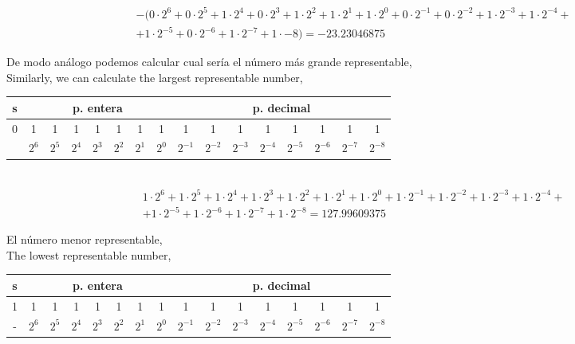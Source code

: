 \begin{equation*}
\begin{split}
&-(0\cdot 2^6+0 \cdot 2^5+ 1\cdot 2^4+ 0 \cdot 2^3+ 1 \cdot 2^2 + 1 \cdot 2^1 + 1 \cdot 2^0 + 0 \cdot 2^{-1}+ 0 \cdot 2^{-2}+ 1 \cdot 2^{-3}+ 1 \cdot 2^{-4}+ \\
& +1 \cdot 2^{-5}+0 \cdot 2^{-6} +1 \cdot 2^{-7}+1 \cdot {-8}) = - 23.23046875
\end{split}
\end{equation*}

\begin{paracol}{2}
De modo análogo podemos calcular cual sería el número más grande representable,\\
\switchcolumn
Similarly, we can calculate the largest representable number, 
\end{paracol}

\begin{tabular}{|c||c|c|c|c|c|c|c||c|c|c|c|c|c|c|c|}
\hline
s&\multicolumn{7}{c||}{p. entera}&\multicolumn{8}{c|}{p. decimal}\\
\hline
0&1&1&1&1&1&1&1&1&1&1&1&1&1&1&1\\
\hline
&$2^{6}$&$2^{5}$&$2^{4}$&$2^{3}$&$2^{2}$&$2^{1}$&$2^{0}$&$2^{-1}$&$2^{-2}$&$2^{-3}$&$2^{-4}$&$2^{-5}$&$2^{-6}$&$2^{-7}$&$2^{-8}$\\
\hline
\end{tabular}\\

\begin{equation*}
\begin{split}
&1\cdot 2^6+1 \cdot 2^5+ 1\cdot 2^4+ 1 \cdot 2^3+ 1 \cdot 2^2 + 1 \cdot 2^1 + 1 \cdot 2^0 + 1 \cdot 2^{-1}+ 1 \cdot 2^{-2}+ 1 \cdot 2^{-3}+ 1 \cdot 2^{-4}+ \\
&+1 \cdot 2^{-5}+1 \cdot 2^{-6} +1 \cdot 2^{-7}+ 1\cdot 2^{-8} =  127.99609375
\end{split}
\end{equation*}

\begin{paracol}{2}
El número menor representable,\\
\switchcolumn
The lowest representable number,
\end{paracol}

\begin{tabular}{|c||c|c|c|c|c|c|c||c|c|c|c|c|c|c|c|}
\hline
s&\multicolumn{7}{c||}{p. entera}&\multicolumn{8}{c|}{p. decimal}\\
\hline
1&1&1&1&1&1&1&1&1&1&1&1&1&1&1&1\\
\hline
-&$2^{6}$&$2^{5}$&$2^{4}$&$2^{3}$&$2^{2}$&$2^{1}$&$2^{0}$&$2^{-1}$&$2^{-2}$&$2^{-3}$&$2^{-4}$&$2^{-5}$&$2^{-6}$&$2^{-7}$&$2^{-8}$\\
\hline
\end{tabular}\\


